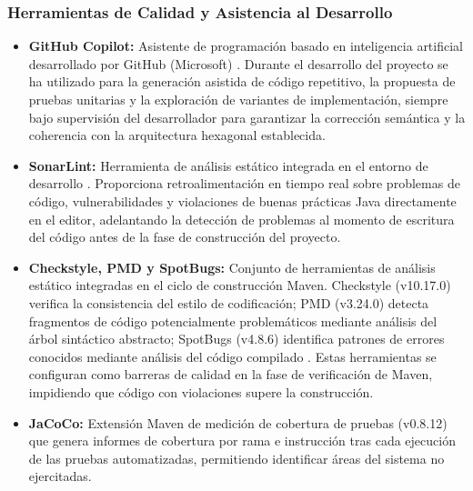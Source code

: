 \subsubsection{Herramientas de Calidad y Asistencia al Desarrollo}

\begin{itemize}
    \item \textbf{GitHub Copilot:} Asistente de programación basado en
    inteligencia artificial desarrollado por GitHub (Microsoft)
    \parencite{github_copilot_2024}. Durante el desarrollo del proyecto se ha
    utilizado para la generación asistida de código repetitivo, la propuesta
    de pruebas unitarias y la exploración de variantes de implementación, siempre
    bajo supervisión del desarrollador para garantizar la corrección semántica
    y la coherencia con la arquitectura hexagonal establecida.

    \item \textbf{SonarLint:} Herramienta de análisis estático integrada en el entorno de desarrollo \parencite{sonarsource_sonarlint_2024}. Proporciona retroalimentación en tiempo real sobre problemas de código, vulnerabilidades y violaciones de buenas prácticas Java directamente en el editor, adelantando la detección de problemas al momento de escritura del código antes de la fase de construcción del proyecto.

    \item \textbf{Checkstyle, PMD y SpotBugs:} Conjunto de herramientas de
    análisis estático integradas en el ciclo de construcción Maven.
    Checkstyle (v10.17.0) verifica la consistencia del estilo de codificación;
    PMD (v3.24.0) detecta fragmentos de código potencialmente problemáticos
    mediante análisis del árbol sintáctico abstracto; SpotBugs (v4.8.6)
    identifica patrones de errores conocidos mediante análisis del código compilado \parencite{owasp_password_2024}. Estas herramientas se configuran como barreras de calidad en la fase de verificación de Maven, impidiendo que código con violaciones supere la construcción.

    \item \textbf{JaCoCo:} Extensión Maven de medición de cobertura de pruebas
    (v0.8.12) que genera informes de cobertura por rama e instrucción tras
    cada ejecución de las pruebas automatizadas, permitiendo identificar áreas del sistema no ejercitadas.

\end{itemize}